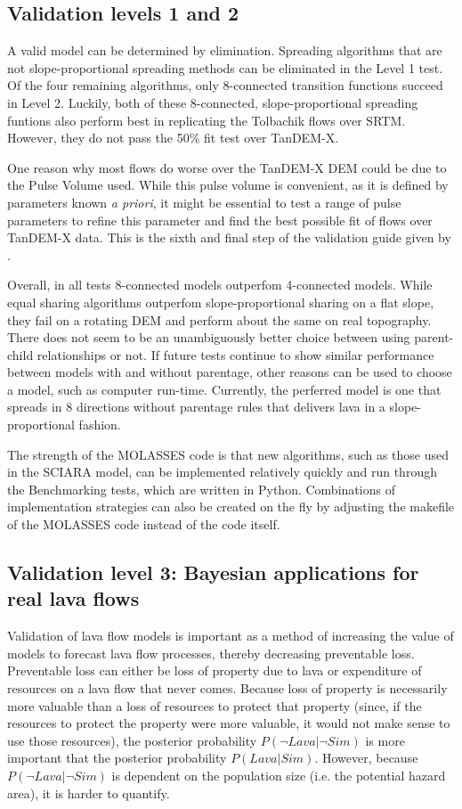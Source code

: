 \documentclass[12pt,letter]{article}
\begin{document}
	\subsection{Validation levels 1 and 2}
	A valid model can be determined by elimination. Spreading algorithms that are not slope-proportional spreading methods can be eliminated in the Level 1 test. Of the four remaining algorithms, only 8-connected transition functions succeed in Level 2. Luckily, both of these 8-connected, slope-proportional spreading funtions also perform best in replicating the Tolbachik flows over SRTM. However, they do not pass the 50\% fit test over TanDEM-X.
	
	One reason why most flows do worse over the TanDEM-X DEM could be due to the Pulse Volume used. While this pulse volume is convenient, as it is defined by parameters known \textit{a priori}, it might be essential to test a range of pulse parameters to refine this parameter and find the best possible fit of flows over TanDEM-X data. This is the sixth and final step of the validation guide given by \citet{bayarri2007framework}.
	
	Overall, in all tests 8-connected models outperfom 4-connected models. While equal sharing algorithms outperfom slope-proportional sharing on a flat slope, they fail on a rotating DEM and perform about the same on real topography. There does not seem to be an unambiguously better choice between using parent-child relationships or not. If future tests continue to show similar performance between models with and without parentage, other reasons can be used to choose a model, such as computer run-time. Currently, the perferred model is one that spreads in 8 directions without parentage rules that delivers lava in a slope-proportional fashion.
	
	The strength of the MOLASSES code is that new algorithms, such as those used in the SCIARA model, can be implemented relatively quickly and run through the Benchmarking tests, which are written in Python. Combinations of implementation strategies can also be created on the fly by adjusting the makefile of the MOLASSES code instead of the code itself.

	\subsection{Validation level 3: Bayesian applications for real lava flows}
		Validation of lava flow models is important as a method of increasing the value of models to forecast lava flow processes, thereby decreasing preventable loss. Preventable loss can either be loss of property due to lava or expenditure of resources on a lava flow that never comes. Because loss of property is necessarily more valuable than a loss of resources to protect that property (since, if the resources to protect the property were more valuable, it would not make sense to use those resources), the posterior probability $P(\neg Lava|\neg Sim)$ is more important that the posterior probability $P(Lava|Sim)$. However, because $P(\neg Lava|\neg Sim)$ is dependent on the population size (i.e. the potential hazard area), it is harder to quantify.
\end{document}
